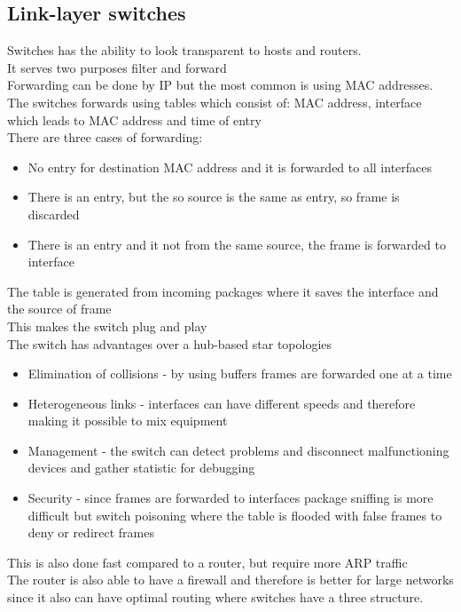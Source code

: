 \documentclass[12pt, a4paper]{article}
\begin{document}
		\subsection{Link-layer switches}
			Switches has the ability to look transparent to hosts and routers.\\
			It serves two purposes filter and forward\\
			Forwarding can be done by IP but the most common is using MAC addresses.\\
			The switches forwards using tables which consist of: MAC address, interface which leads to MAC address and time of entry\\
			There are three cases of forwarding:
			\begin{itemize}
				\item No entry for destination MAC address and it is forwarded to all interfaces
				\item There is an entry, but the so source is the same as entry, so frame is discarded
				\item There is an entry and it not from the same source, the frame is forwarded to interface
			\end{itemize}
			The table is generated from incoming packages where it saves the interface and the source of frame\\
			This makes the switch plug and play\\
			The switch has advantages over a hub-based star topologies 
			\begin{itemize}
				\item Elimination of collisions - by using buffers frames are forwarded one at a time
				\item Heterogeneous links - interfaces can have different speeds and therefore making it possible to mix equipment
				\item Management - the switch can detect problems and disconnect malfunctioning devices and gather statistic for debugging
				\item Security - since frames are forwarded to interfaces package sniffing is more difficult but switch poisoning where the table is flooded with false frames to deny or redirect frames
			\end{itemize}
			This is also done fast compared to a router, but require more ARP traffic\\
			The router is also able to have a firewall and therefore is better for large networks since it also can have optimal routing where switches have a three structure.\\
\end{document}
